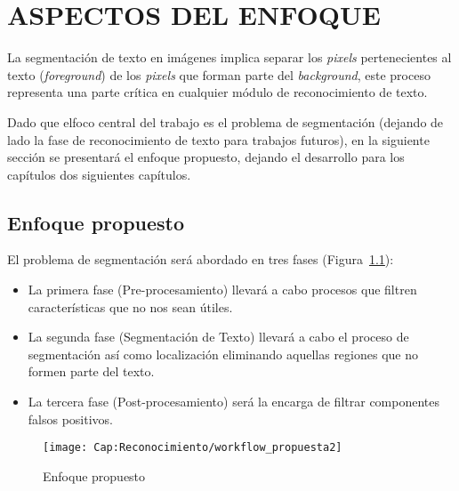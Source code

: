 \chapter{ASPECTOS DEL ENFOQUE}
\label{cap-aspectosenfoque}
\setcounter{secnumdepth}{0}

La segmentación de texto en imágenes implica separar los \textit{pixels} 
pertenecientes al texto (\textit{foreground}) de los \textit{pixels} que forman 
parte del \textit{background}, este proceso representa una parte crítica en cualquier
módulo de reconocimiento de texto.

Dado que elfoco central del trabajo es el problema de segmentación 
(dejando de lado la fase de reconocimiento de texto para trabajos futuros), en
la siguiente sección se presentará el enfoque propuesto, dejando el desarrollo
para los capítulos dos siguientes capítulos.

\setcounter{secnumdepth}{3}
\section{Enfoque propuesto}

El problema de segmentación será abordado en tres fases (Figura~\ref{fig:cap-reconocimiento:workflowenfoque}):
\begin{itemize}
	\item La primera fase (Pre-procesamiento) llevará a cabo procesos que filtren características
	que no nos sean útiles.
	\item La segunda fase (Segmentación de Texto) llevará a cabo el proceso de segmentación así como 
	localización eliminando aquellas regiones que no formen parte del texto.
	\item La tercera fase (Post-procesamiento) será la encarga de filtrar componentes falsos 
	positivos.
\end{itemize}

\begin{figure}[h!]
	\centering
	\texttt{[image: Cap:Reconocimiento/workflow\_propuesta2]}
	\caption{Enfoque propuesto}
	\label{fig:cap-reconocimiento:workflowenfoque}
\end{figure}

